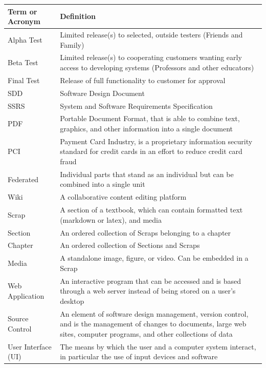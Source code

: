 \documentclass[letterpaper, 10pt, draftclsnofoot, compsoc, onecolumn]{IEEEtran}
\begin{document}
\begin{center}

\tablehead{}
\begin{supertabular}{|p{3cm}|p{12cm}|}
\hline
Term or Acronym & Definition\\\hline
Alpha Test & Limited release(s) to selected, outside testers (Friends and Family)\\ \hline
Beta Test & Limited release(s) to cooperating customers wanting early access to developing systems (Professors 
and other educators)\\ \hline
Final Test & Release of full functionality to customer for approval \\ \hline
SDD & Software Design Document \\ \hline
SSRS & System and Software Requirements Specification \\ \hline
PDF & Portable Document Format, that is able to combine text, graphics, and other information into a single document \\ \hline
PCI & Payment Card Industry, is a proprietary information security standard for credit cards in an effort to reduce credit card fraud \\ \hline
Federated & Individual parts that stand as an individual but can be combined into a single unit \\ \hline
Wiki & A collaborative content editing platform \\ \hline
Scrap & A section of a textbook, which can contain formatted text (markdown or latex), and media \\ \hline
Section & An ordered collection of Scraps belonging to a chapter\\ \hline
Chapter & An ordered collection of Sections and Scraps\\ \hline
Media & A standalone image, figure, or video. Can be embedded in a Scrap\\ \hline
Web Application & An interactive program that can be accessed and is based through a web server instead of 
being stored on a user's desktop\\ \hline
Source Control & An element of software design management, version control, and is the 
management of changes to documents, large web sites, computer programs, and other 
collections of data \\ \hline
User Interface (UI)  & The means by which the user and a computer system interact, in particular the use of 
input devices and software\\ \hline
\end{supertabular}

\end{center}
\end{document}
